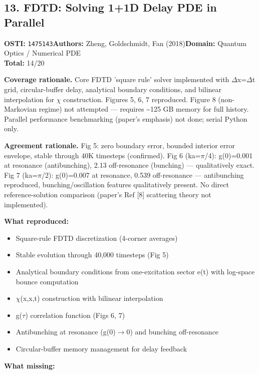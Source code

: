 \subsection{13. FDTD: Solving 1+1D Delay PDE in Parallel}
\textbf{OSTI:} \texttt{1475143}\quad\textbf{Authors:} Zheng, Goldschmidt, Fan (2018)\quad\textbf{Domain:} Quantum Optics / Numerical PDE\\
\quad{}\quad\textbf{Total:} 14/20\par\smallskip
\noindent\textbf{Coverage rationale.} Core FDTD 'square rule' solver implemented with $\Delta$x=$\Delta$t grid, circular-buffer delay, analytical boundary conditions, and bilinear interpolation for $\chi$ construction. Figures 5, 6, 7 reproduced. Figure 8 (non-Markovian regime) not attempted --- requires \textasciitilde{}125 GB memory for full  history. Parallel performance benchmarking (paper's emphasis) not done; serial Python only.\par
\noindent\textbf{Agreement rationale.} Fig 5: zero boundary error, bounded interior error envelope, stable through 40K timesteps (confirmed). Fig 6 (ka=$\pi$/4): g(0)=0.001 at resonance (antibunching), 2.13 off-resonance (bunching) --- qualitatively exact. Fig 7 (ka=$\pi$/2): g(0)=0.007 at resonance, 0.539 off-resonance --- antibunching reproduced, bunching/oscillation features qualitatively present. No direct reference-solution comparison (paper's Ref [8] scattering theory not implemented).\par\smallskip
\noindent\textbf{What reproduced:}
\begin{itemize}[leftmargin=1.4em,itemsep=0.2em,topsep=0.2em]
\item Square-rule FDTD discretization (4-corner averages)
\item Stable  evolution through 40,000 timesteps (Fig 5)
\item Analytical boundary conditions from one-excitation sector e(t) with log-space bounce computation
\item $\chi$(x,x,t) construction with bilinear interpolation
\item g($\tau$) correlation function (Figs 6, 7)
\item Antibunching at resonance (g(0)$\rightarrow$0) and bunching off-resonance
\item Circular-buffer memory management for delay feedback
\end{itemize}\noindent\textbf{What missing:}
